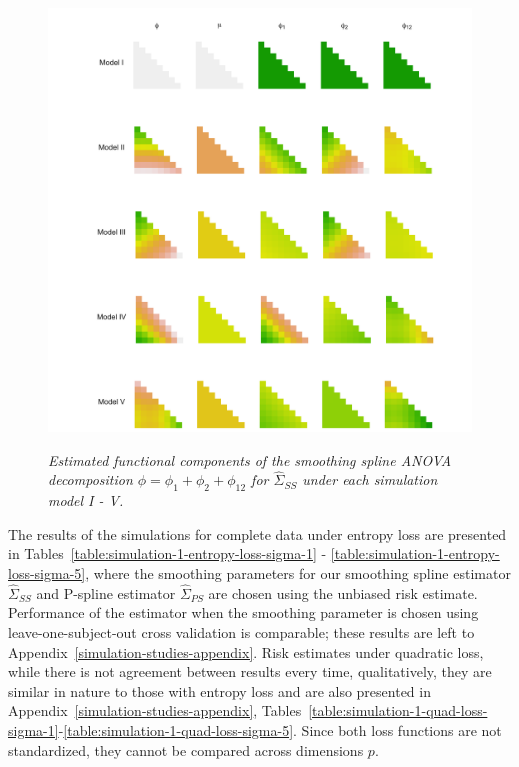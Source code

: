 \begin{figure}[H] 
  \includegraphics[width = \textwidth]{img/chapter-4/ssanova-estimate-lattice} \label{fig:ssanova-component-lattice}
  \caption{\textit{Estimated functional components of the smoothing spline ANOVA decomposition $\phi = \phi_1 + \phi_2 + \phi_{12}$ for $\hat{\Sigma}_{SS}$ under each simulation model I - V.}}
\end{figure}

\bigskip
The results of the simulations for complete data under entropy loss are presented in Tables~\ref{table:simulation-1-entropy-loss-sigma-1} - \ref{table:simulation-1-entropy-loss-sigma-5}, where the smoothing parameters for our smoothing spline estimator $\hat{\Sigma}_{SS}$ and P-spline estimator $\hat{\Sigma}_{PS}$ are chosen using the unbiased risk estimate. Performance of the estimator when the smoothing parameter is chosen using leave-one-subject-out cross validation is comparable; these results are left to Appendix~\ref{simulation-studies-appendix}. Risk estimates under quadratic loss, while there is not agreement between results every time, qualitatively, they are similar in nature to those with entropy loss and are also presented in Appendix~\ref{simulation-studies-appendix}, Tables~\ref{table:simulation-1-quad-loss-sigma-1}-\ref{table:simulation-1-quad-loss-sigma-5}. Since both loss functions are not standardized, they cannot be compared across dimensions $p$.

